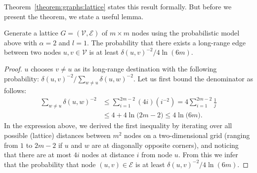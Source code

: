 Theorem~\ref{theorem:graphs:lattice} states this result formally.
But before we present the theorem, we state a useful lemma.

\begin{lemma}
    \label{lemma:graphs:lattice}
    Generate a lattice $G = (\mathcal{V}, \mathcal{E})$ of $m \times m$
    nodes using the probabilistic model above
    with $\alpha = 2$ and $l = 1$.
    The probability that there exists a long-range edge between two nodes
    $u, v \in \mathcal{V}$ is at least $\delta(u, v)^{-2} / 4 \ln(6m)$.
\end{lemma}
\begin{proof}
    $u$ chooses $v \neq u$ as its long-range destination
    with the following probability: $\delta(u, v)^{-2} / \sum_{w \neq u} \delta(u, w)^{-2}$.
    Let us first bound the denominator as follows:
    \begin{align*}
        \sum_{w \neq u} \delta(u, w)^{-2} &\leq \sum_{i = 1}^{2m - 2} (4i)(i^{-2})
        = 4 \sum_{i = 1}^{2m - 2} \frac{1}{j} \\
        &\leq 4 + 4 \ln \big( 2m - 2 \big) \leq 4 \ln \big( 6m \big).
    \end{align*}
    In the expression above, we derived the first inequality by iterating over
    all possible (lattice) distances between $m^2$ nodes on a two-dimensional grid
    (ranging from $1$ to $2m - 2$ if $u$ and $w$ are at diagonally opposite corners),
    and noticing that there are at most $4i$ nodes at distance $i$ from node $u$.
    From this we infer that the probability that node $(u, v) \in \mathcal{E}$ is at least
    $\delta(u, v)^{-2} / 4 \ln(6m)$.
\end{proof}

